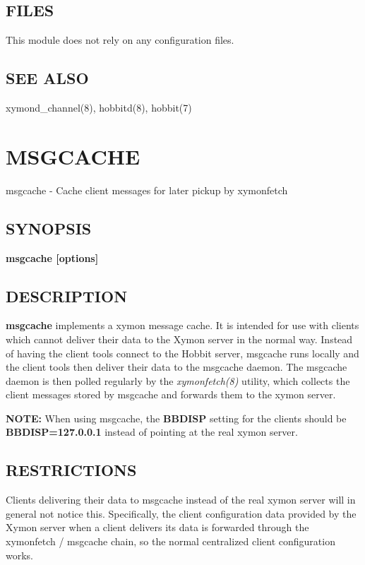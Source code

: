 \subsection{FILES}
 This module does not rely on any configuration files. 

 
\subsection{SEE ALSO}
xymond\_channel(8), hobbitd(8), hobbit(7) 

  

%

%

\newpage
\section{MSGCACHE}

 msgcache - Cache client messages for later pickup by xymonfetch 

 
\subsection{SYNOPSIS}
\textbf{msgcache [options]}


 
\subsection{DESCRIPTION}
\textbf{msgcache}
 implements a xymon message cache. It is intended for use with clients which cannot deliver their data to the Xymon server in the normal way. Instead of having the client tools connect to the Hobbit server, msgcache runs locally and the client tools then deliver their data to the msgcache daemon. The msgcache daemon is then polled regularly by the \emph{xymonfetch(8)}
 utility, which collects the client messages stored by msgcache and forwards them to the xymon server. 

 \textbf{NOTE:}
 When using msgcache, the \textbf{BBDISP}
 setting for the clients should be \textbf{BBDISP=127.0.0.1}
 instead of pointing at the real xymon server. 


 
\subsection{RESTRICTIONS}
 Clients delivering their data to msgcache instead of the real xymon server will in general not notice this. Specifically, the client configuration data provided by the Xymon server when a client delivers its data is forwarded through the xymonfetch / msgcache chain, so the normal centralized client configuration works. 

